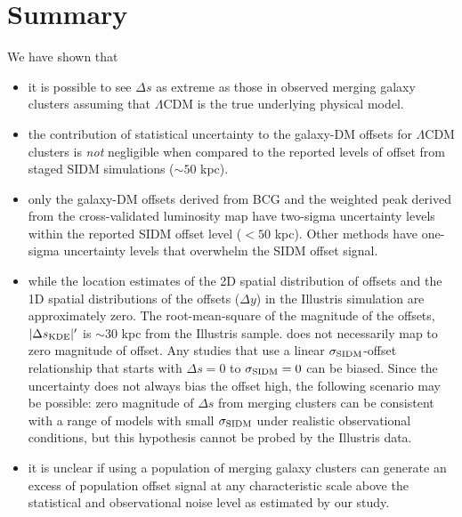 \section{Summary}
We have shown that 
\begin{itemize}
		\item it is possible to  
			see $\Delta s$ as extreme as those in observed merging galaxy clusters assuming that
			$\Lambda$CDM is the true underlying physical model.  \\

		\item the contribution of statistical uncertainty to the galaxy-DM offsets 
			for $\Lambda$CDM clusters is {\it not} negligible when compared to the reported
			levels of offset from staged SIDM simulations ($\sim 50$ kpc).\\ 

		\item only the galaxy-DM offsets derived from BCG and the weighted peak
			derived from the cross-validated
			luminosity map have two-sigma uncertainty levels within the reported SIDM offset
			level ($< 50$ kpc). Other methods have one-sigma uncertainty levels that overwhelm the
			SIDM offset signal.\\ 

		\item while the location estimates of the 2D spatial distribution of offsets and the
			1D spatial distributions of the offsets ($\Delta y$) in the Illustris
			simulation are approximately zero.
			The root-mean-square of the magnitude of the
		offsets, $|\Delta s_{\rm KDE}|'$ is $\sim 30$ kpc from the Illustris sample. 
			does not necessarily map to zero magnitude of offset.  
			Any studies that use a linear $\sigma_{\rm SIDM}$-offset relationship
			that starts with $\Delta s = 0$ to $\sigma_{\rm SIDM} = 0$ can be biased. 
			Since the uncertainty does not always bias the offset high, 
		the following scenario may be possible: zero magnitude of
			$\Delta s$ from merging clusters 
			can be consistent with a range of models with small
			$\sigma_{\rm SIDM}$ under realistic observational conditions,
			but this hypothesis cannot be probed by the Illustris data.\\
  
	 \item it is unclear if using a population of merging galaxy clusters 
		 can generate an excess of population offset signal at any characteristic
		 scale above the statistical
		 and observational noise level as estimated by our study.   
			\\



\end{itemize}
